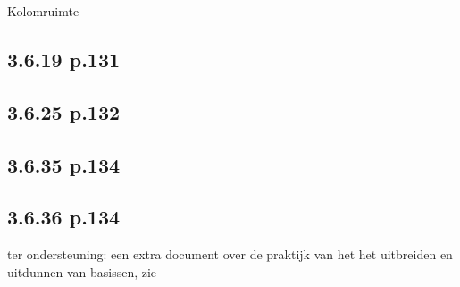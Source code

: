 \documentclass{article}
\begin{document}
Kolomruimte 

\subsection{3.6.19 p.131}

\subsection{3.6.25 p.132}

\subsection{3.6.35 p.134}

\subsection{3.6.36 p.134}


ter ondersteuning: een extra document over de praktijk van het het uitbreiden en uitdunnen van basissen, zie 
\end{document}
